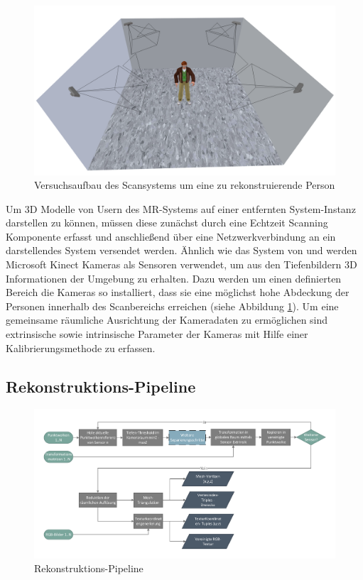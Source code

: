 \begin{figure}[H]
	\centering
	\includegraphics[width=.7\textwidth]{figs/scanning_setup}
	\caption{Versuchsaufbau des Scansystems um eine zu rekonstruierende Person}
	\label{fig:recon_setup}
\end{figure}

Um 3D Modelle von Usern des MR-Systems auf einer entfernten System-Instanz 
darstellen zu können, müssen diese zunächst durch eine Echtzeit Scanning 
Komponente erfasst und anschließend über eine Netzwerkverbindung an ein 
darstellendes System versendet werden. Ähnlich wie das System von 
\cite{alexiadis2013real} und \cite{mekuria2013teleimmersion} werden Microsoft 
Kinect Kameras als Sensoren verwendet, um aus den Tiefenbildern 3D Informationen 
der Umgebung zu erhalten. Dazu werden um einen definierten Bereich die Kameras 
so installiert, dass sie eine möglichst hohe Abdeckung der Personen innerhalb 
des Scanbereichs erreichen (siehe Abbildung \ref{fig:recon_setup}). Um eine 
gemeinsame räumliche Ausrichtung der Kameradaten zu ermöglichen sind 
extrinsische sowie intrinsische Parameter der Kameras mit Hilfe einer 
Kalibrierungsmethode zu erfassen.

\subsection{Rekonstruktions-Pipeline}


\begin{figure}[H]
	\centering
	\includegraphics[width=\textwidth]{figs/recon_pipeline}
	\caption{Rekonstruktions-Pipeline}
	\label{fig:recon_pipeline}
\end{figure}

